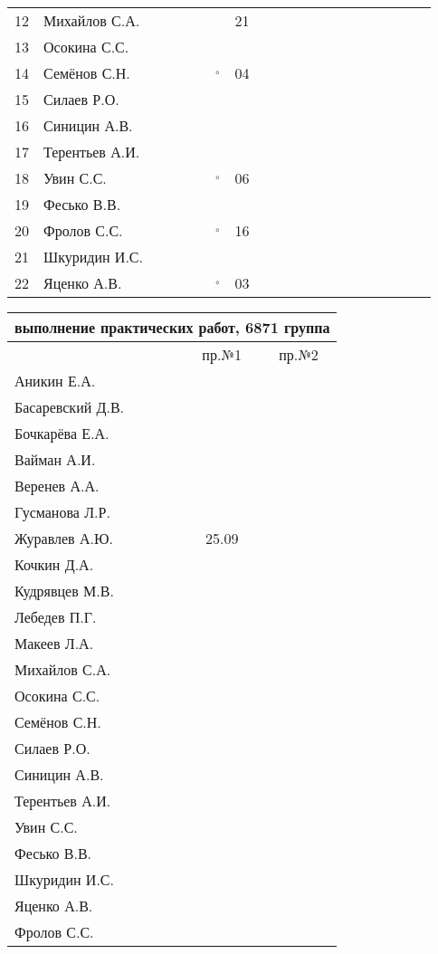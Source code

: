\documentclass[a4paper,11pt]{article}
\newcommand*\OK{&\small \ding{51}$\!\!_\circ$} %
\newcommand*\ok{&{\small \ding{51}}} %
\newcommand*\no{&{\small }} %
\begin{document}
\begin{tabular}{l|l|cccccccccccccccccc}
12&Михайлов С.А.   \no\no\ok\ok\ok&21&&&&&&&&&&&&\\
13&Осокина С.С.    \ok\ok\ok\ok\no\no&&&&&&&&&&&&\\
14&Семёнов С.Н.    \ok\ok\ok\ok\OK&04&&&&&&&&&&&&\\
15&Силаев Р.О.     \ok\ok\no\no\no\no&&&&&&&&&&&&\\
16&Синицин А.В.    \ok\ok\no\ok\no\no&&&&&&&&&&&&\\
17&Терентьев А.И.  \ok\ok\ok\ok\no\no&&&&&&&&&&&&\\
18&Увин С.С.       \ok\ok\ok\ok\OK&06&&&&&&&&&&&&\\
19&Фесько В.В.     \no\no\no\no\no\no&&&&&&&&&&&&\\
20&Фролов С.С.     \ok\ok\ok\ok\OK&16&&&&&&&&&&&&\\ 
21&Шкуридин И.С.   \ok\ok\ok\ok\ok\no&&&&&&&&&&&&\\
22&Яценко А.В.     \ok\ok\ok\ok\OK&03&&&&&&&&&&&&\\ 
\bottomrule
\end{tabular} 
\newpage

\begin{tabular}{l|cc}
\multicolumn{3}{c}{выполнение практических работ, 6871 группа} \\
\toprule
& пр.№1 & пр.№2 \\
\midrule
Аникин Е.А.     &     &\\    
Басаревский Д.В.&     &\\
Бочкарёва Е.А.  &     &\\
Вайман А.И.     &     &\\
Веренев А.А.    &     &\\
Гусманова Л.Р.  &     &\\
Журавлев А.Ю.   &25.09&\\
Кочкин Д.А.     &     &\\
Кудрявцев М.В.  &     &\\
Лебедев П.Г.    &     &\\
Макеев Л.А.     &     &\\
Михайлов С.А.   &     &\\
Осокина С.С.    &     &\\
Семёнов С.Н.    &     &\\
Силаев Р.О.     &     &\\
Синицин А.В.    &     &\\
Терентьев А.И.  &     &\\
Увин С.С.       &     &\\
Фесько В.В.     &     &\\
Шкуридин И.С.   &     &\\
Яценко А.В.     &     &\\
Фролов С.С.     &     &\\
\bottomrule
\end{tabular}
\end{document}
